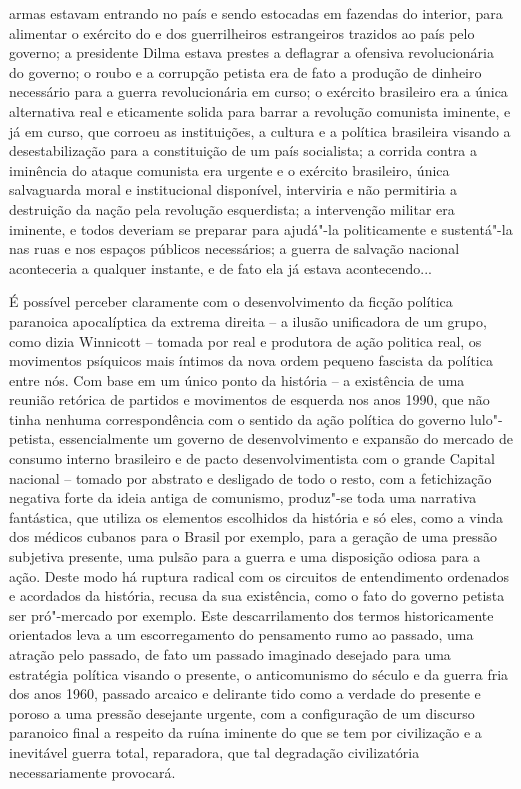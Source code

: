 {armas estavam entrando no país e sendo estocadas em fazendas do
interior, para alimentar o exército do  e dos guerrilheiros
estrangeiros trazidos ao país pelo governo; a presidente Dilma estava
prestes a deflagrar a ofensiva revolucionária do governo; o roubo e a
corrupção petista era de fato a produção de dinheiro necessário para a
guerra revolucionária em curso; o exército brasileiro era a única
alternativa real e eticamente solida para barrar a revolução comunista
iminente, e já em curso, que corroeu as instituições, a cultura e a
política brasileira visando a desestabilização para a constituição de um
país socialista; a corrida contra a iminência do ataque comunista era
urgente e o exército brasileiro, única salvaguarda moral e institucional
disponível, interviria e não permitiria a destruição da nação pela
revolução esquerdista; a intervenção militar era iminente, e todos
deveriam se preparar para ajudá"-la politicamente e sustentá"-la nas ruas
e nos espaços públicos necessários; a guerra de salvação nacional
aconteceria a qualquer instante, e de fato ela já estava acontecendo...}

É possível perceber claramente com o desenvolvimento da ficção política
paranoica apocalíptica da extrema direita -- a ilusão unificadora de um
grupo, como dizia Winnicott -- tomada por real e produtora de ação
politica real, os movimentos psíquicos mais íntimos da nova ordem
pequeno fascista da política entre nós. Com base em um único ponto da
história -- a existência de uma reunião retórica de partidos e
movimentos de esquerda nos anos 1990, que não tinha nenhuma
correspondência com o sentido da ação política do governo lulo"-petista,
essencialmente um governo de desenvolvimento e expansão do mercado de
consumo interno brasileiro e de pacto desenvolvimentista com o grande
Capital nacional -- tomado por abstrato e desligado de todo o resto, com
a fetichização negativa forte da ideia antiga de comunismo, produz"-se
toda uma narrativa fantástica, que utiliza os elementos escolhidos da
história e só eles, como a vinda dos médicos cubanos para o Brasil por
exemplo, para a geração de uma pressão subjetiva presente, uma pulsão
para a guerra e uma disposição odiosa para a ação. Deste modo há ruptura
radical com os circuitos de entendimento ordenados e acordados da
história, recusa da sua existência, como o fato do governo petista ser
pró"-mercado por exemplo. Este descarrilamento dos termos historicamente
orientados leva a um escorregamento do pensamento rumo ao passado, uma
atração pelo passado, de fato um passado imaginado desejado para uma
estratégia política visando o presente, o anticomunismo do século  e
da guerra fria dos anos 1960, passado arcaico e delirante tido como a
verdade do presente e poroso a uma pressão desejante urgente, com a
configuração de um discurso paranoico final a respeito da ruína iminente
do que se tem por civilização e a inevitável guerra total, reparadora,
que tal degradação civilizatória necessariamente provocará.

